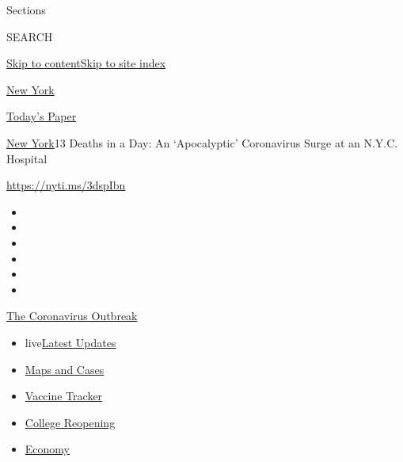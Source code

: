 Sections

SEARCH

\protect\hyperlink{site-content}{Skip to
content}\protect\hyperlink{site-index}{Skip to site index}

\href{https://www.nytimes3xbfgragh.onion/section/nyregion}{New York}

\href{https://myaccount.nytimes3xbfgragh.onion/auth/login?response_type=cookie\&client_id=vi}{}

\href{https://www.nytimes3xbfgragh.onion/section/todayspaper}{Today's
Paper}

\href{/section/nyregion}{New York}\textbar{}13 Deaths in a Day: An
`Apocalyptic' Coronavirus Surge at an N.Y.C. Hospital

\url{https://nyti.ms/3dspIbn}

\begin{itemize}
\item
\item
\item
\item
\item
\item
\end{itemize}

\href{https://www.nytimes3xbfgragh.onion/news-event/coronavirus?action=click\&pgtype=Article\&state=default\&region=TOP_BANNER\&context=storylines_menu}{The
Coronavirus Outbreak}

\begin{itemize}
\tightlist
\item
  live\href{https://www.nytimes3xbfgragh.onion/2020/08/04/world/coronavirus-cases.html?action=click\&pgtype=Article\&state=default\&region=TOP_BANNER\&context=storylines_menu}{Latest
  Updates}
\item
  \href{https://www.nytimes3xbfgragh.onion/interactive/2020/us/coronavirus-us-cases.html?action=click\&pgtype=Article\&state=default\&region=TOP_BANNER\&context=storylines_menu}{Maps
  and Cases}
\item
  \href{https://www.nytimes3xbfgragh.onion/interactive/2020/science/coronavirus-vaccine-tracker.html?action=click\&pgtype=Article\&state=default\&region=TOP_BANNER\&context=storylines_menu}{Vaccine
  Tracker}
\item
  \href{https://www.nytimes3xbfgragh.onion/2020/08/02/us/covid-college-reopening.html?action=click\&pgtype=Article\&state=default\&region=TOP_BANNER\&context=storylines_menu}{College
  Reopening}
\item
  \href{https://www.nytimes3xbfgragh.onion/live/2020/08/04/business/stock-market-today-coronavirus?action=click\&pgtype=Article\&state=default\&region=TOP_BANNER\&context=storylines_menu}{Economy}
\end{itemize}


